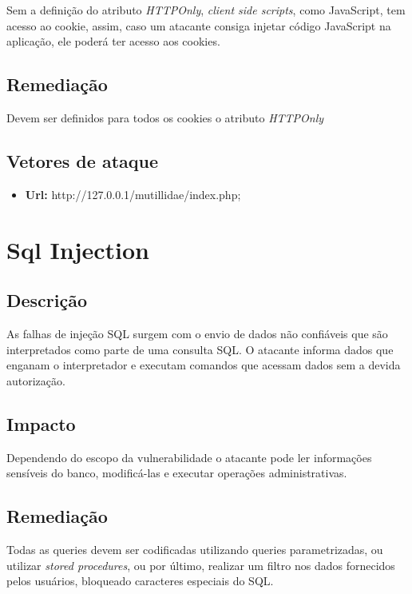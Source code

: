 \documentclass{ufscThesis}
\newcommand{\+}{\discretionary{\mbox{${\bm\cdot}\mkern-1mu$}}{}{}}
\renewcommand\+{\discretionary{}{}{}}
\begin{document}
Sem a definição do atributo \emph{HTTPOnly}, \emph{client side scripts}, como JavaScript, tem acesso ao cookie, assim, caso um atacante consiga injetar código JavaScript na aplicação, ele poderá ter acesso aos cookies.

\subsection{Remediação}

Devem ser definidos para todos os cookies o atributo \emph{HTTPOnly}

\subsection{Vetores de ataque}

\begin{itemize}
\item \textbf{Url:} http://127.0.0.1/mutillidae/index.php;
\end{itemize}
\section{Sql Injection}

\subsection{Descrição}

As falhas de injeção SQL surgem com o envio de dados não confiáveis que são interpretados como parte de uma consulta SQL. O atacante informa dados que enganam o interpretador e executam comandos que acessam dados sem a devida autorização.

\subsection{Impacto}

Dependendo do escopo da vulnerabilidade o atacante pode ler informações sensíveis do banco, modificá-las e executar operações administrativas.

\subsection{Remediação}

Todas as queries devem ser codificadas utilizando queries parametrizadas, ou utilizar \emph{stored procedures}, ou por último, realizar um filtro nos dados fornecidos pelos usuários, bloqueado caracteres especiais do SQL.
\end{document}
